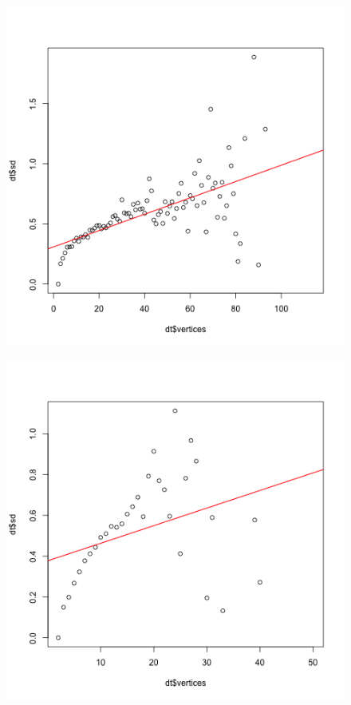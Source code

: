 \documentclass[paper=a4, fontsize=11pt]{scrartcl} %
\begin{document}
\begin{figure}
\centering
\begin{minipage}{.5\textwidth}
  \centering
  \includegraphics[width=\linewidth]{homoscedasticity_Catalan.png}
  \label{fig:13}
\end{minipage}%
\begin{minipage}{.5\textwidth}
  \centering
  \includegraphics[width=\linewidth]{homoscedasticity_Chinese.png}
  \label{fig:14}
\end{minipage}
\end{figure}
\end{document}
